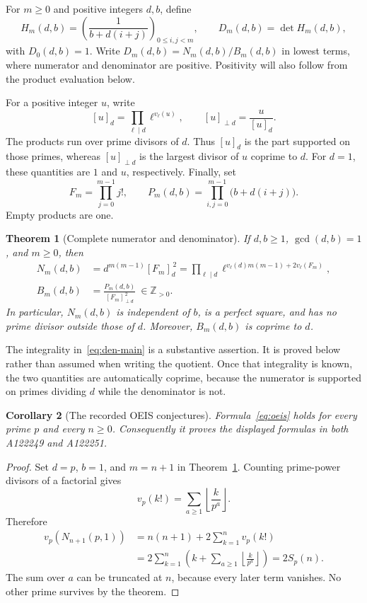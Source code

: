 \documentclass[11pt,a4paper]{article}
\newtheorem{theorem}{Theorem}[section]
\newtheorem{corollary}[theorem]{Corollary}
\theoremstyle{definition}
\theoremstyle{remark}
\newcommand{\Z}{\mathbb Z}
\newcommand{\sfac}{F}
\newcommand{\floor}[1]{\left\lfloor #1\right\rfloor}
\newcommand{\freepart}[2]{\left[#1\right]_{\perp #2}}
\newcommand{\supported}[2]{\left[#1\right]_{#2}}
\begin{document}
For $m\ge0$ and positive integers $d,b$, define
\begin{equation}
 H_m(d,b)=\left(\frac1{b+d(i+j)}\right)_{0\le i,j<m},
 \qquad D_m(d,b)=\det H_m(d,b),
 \label{eq:matrix}
\end{equation}
with $D_0(d,b)=1$. Write $D_m(d,b)=N_m(d,b)/B_m(d,b)$ in lowest terms,
where numerator and denominator are positive. Positivity will also follow
from the product evaluation below.

For a positive integer $u$, write
\[
 \supported{u}{d}=\prod_{\ell\mid d}\ell^{v_\ell(u)},
 \qquad
 \freepart{u}{d}=\frac{u}{\supported{u}{d}}.
\]
The products run over prime divisors of $d$. Thus
$\supported{u}{d}$ is the part supported on those primes, whereas
$\freepart{u}{d}$ is the largest divisor of $u$ coprime to $d$.
For $d=1$, these quantities are $1$ and $u$, respectively. Finally, set
\[
 \sfac_m=\prod_{j=0}^{m-1}j!,\qquad
 P_m(d,b)=\prod_{i,j=0}^{m-1}\bigl(b+d(i+j)\bigr).
\]
Empty products are one.

\begin{theorem}[Complete numerator and denominator]
\label{thm:main}
If $d,b\ge1$, $\gcd(d,b)=1$, and $m\ge0$, then
\begin{align}
 N_m(d,b)
   &=d^{m(m-1)}\supported{\sfac_m}{d}^{\,2}
     =\prod_{\ell\mid d}
       \ell^{v_\ell(d)m(m-1)+2v_\ell(\sfac_m)},
       \label{eq:num-main}\\
 B_m(d,b)
   &=\frac{P_m(d,b)}{\freepart{\sfac_m}{d}^{\,2}}\ \in\Z_{>0}.
       \label{eq:den-main}
\end{align}
In particular, $N_m(d,b)$ is independent of $b$, is a perfect square, and
has no prime divisor outside those of $d$. Moreover, $B_m(d,b)$ is coprime
to $d$.
\end{theorem}

The integrality in~\eqref{eq:den-main} is a substantive assertion. It is
proved below rather than assumed when writing the quotient. Once that
integrality is known, the two quantities are automatically coprime, because
the numerator is supported on primes dividing $d$ while the denominator is
not.

\begin{corollary}[The recorded OEIS conjectures]
\label{cor:oeis}
Formula~\eqref{eq:oeis} holds for every prime $p$ and every $n\ge0$.
Consequently it proves the displayed formulas in both A122249 and A122251.
\end{corollary}
\begin{proof}
Set $d=p$, $b=1$, and $m=n+1$ in Theorem~\ref{thm:main}.
Counting prime-power divisors of a factorial gives
\[
 v_p(k!)=\sum_{a\ge1}\floor{\frac{k}{p^a}}.
\]
Therefore
\begin{align*}
 v_p(N_{n+1}(p,1))
 &=n(n+1)+2\sum_{k=1}^n v_p(k!)\\
 &=2\sum_{k=1}^n\left(k+\sum_{a\ge1}\floor{\frac{k}{p^a}}\right)
 =2S_p(n).
\end{align*}
The sum over $a$ can be truncated at $n$, because every later term vanishes.
No other prime survives by the theorem.
\end{proof}
\end{document}
